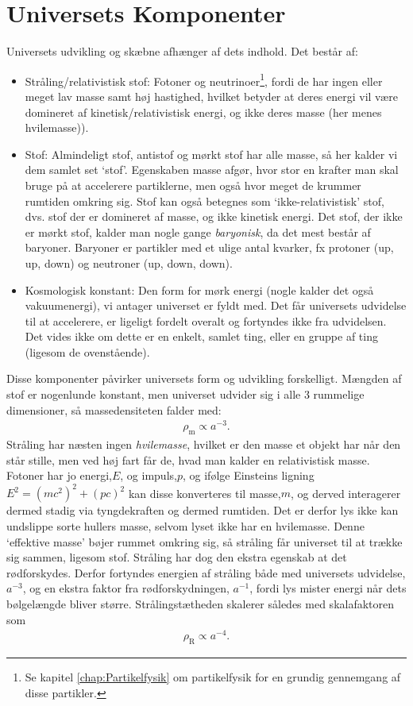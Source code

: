 \section{Universets Komponenter} \label{bestanddele}
Universets udvikling og skæbne afhænger af dets indhold. Det består af:
%
\begin{itemize}
	\item Stråling/relativistisk stof: Fotoner og neutrinoer\footnote{Se kapitel \ref{chap:Partikelfysik} om partikelfysik for en grundig gennemgang af disse partikler.\label{note:partikel}}, fordi de har ingen eller meget lav masse samt høj hastighed, hvilket betyder at deres energi vil være domineret af kinetisk/relativistisk energi, og ikke deres masse (her menes hvilemasse)).
	\item Stof: Almindeligt stof, antistof og mørkt stof har alle masse, så her kalder vi dem samlet set `stof'. Egenskaben masse afgør, hvor stor en krafter man skal bruge på at accelerere partiklerne, men også hvor meget de krummer rumtiden omkring sig. Stof kan også betegnes som `ikke-relativistisk' stof, dvs. stof der er domineret af masse, og ikke kinetisk energi. Det stof, der ikke er mørkt stof, kalder man nogle gange \textit{baryonisk}, da det mest består af baryoner. Baryoner er partikler med et ulige antal kvarker, fx protoner (up, up, down) og neutroner (up, down, down).
	\item Kosmologisk konstant: Den form for mørk energi (nogle kalder det også vakuumenergi), vi antager universet er fyldt med. Det får universets udvidelse til at accelerere, er ligeligt fordelt overalt og fortyndes ikke fra udvidelsen. Det vides ikke om dette er en enkelt, samlet ting, eller en gruppe af ting (ligesom de ovenstående).
\end{itemize}
%
Disse komponenter påvirker universets form og udvikling forskelligt. Mængden af stof er nogenlunde konstant, men universet udvider sig i alle 3 rummelige dimensioner, så massedensiteten falder med:
\begin{align}
\rho_\text{m} \propto a^{-3}.
\end{align}
Stråling har næsten ingen \emph{hvilemasse}, hvilket er den masse et objekt har når den står stille, men ved høj fart får de, hvad man kalder en relativistisk masse. Fotoner har jo energi,$E$, og impuls,$p$, og ifølge Einsteins ligning $E^2=(mc^2)^2 + (pc)^2$ kan disse konverteres til masse,$m$, og derved interagerer dermed stadig via tyngdekraften og dermed rumtiden. Det er derfor lys ikke kan undslippe sorte hullers masse, selvom lyset ikke har en hvilemasse. Denne `effektive masse' bøjer rummet omkring sig, så stråling får universet til at trække sig sammen, ligesom stof. Stråling har dog den ekstra egenskab at det rødforskydes. Derfor fortyndes energien af stråling både med universets udvidelse, $a^{-3}$, og en ekstra faktor fra rødforskydningen, $a^{-1}$, fordi lys mister energi når dets bølgelængde bliver større. Strålingstætheden skalerer således med skalafaktoren som
\begin{align}
\rho_\text{R}\propto a^{-4}.
\end{align}

